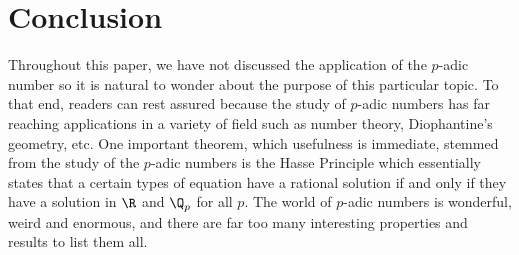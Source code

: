 \chapter{Conclusion}
Throughout this paper, we have not discussed the application of the $p$-adic number so it is natural to wonder about the purpose of this particular topic. To that end, readers can rest assured because the study of $p$-adic numbers has far reaching applications in a variety of field such as number theory, Diophantine's geometry, etc. One important theorem, which usefulness is immediate, stemmed from the study of the $p$-adic numbers is the Hasse Principle \cite{hasse} which essentially states that a certain types of equation have a rational solution if and only if they have a solution in $\R$ and $\Q_p$ for all $p$. 
The world of $p$-adic numbers is wonderful, weird and enormous, and there are far too many interesting properties and results to list them all.